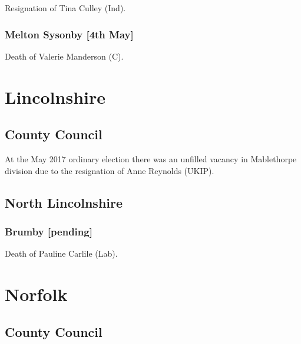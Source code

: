 \documentclass[a4paper,openany]{book}
\begin{document}
\begin{resultsiii}

Resignation of Tina Culley (Ind).

\subsubsection*{Melton Sysonby \hspace*{\fill}\nolinebreak[1]%
\enspace\hspace*{\fill}
[4th May]}


Death of Valerie Manderson (C).

\section{Lincolnshire}

\subsection*{County Council}

At the May 2017 ordinary election there was an unfilled vacancy in Mablethorpe division due to the resignation of Anne Reynolds (UKIP).

\subsection*{North Lincolnshire}

\subsubsection*{Brumby \hspace*{\fill}\nolinebreak[1]%
\enspace\hspace*{\fill}
[pending]}


Death of Pauline Carlile (Lab).

\section{Norfolk}

\subsection*{County Council}


\end{resultsiii}
\end{document}

